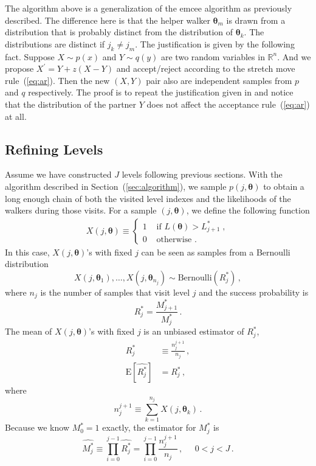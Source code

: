\documentclass[letterpaper, preprint]{aastex}
\newcommand{\bth} {\boldsymbol \theta}
\newcommand{\ee}{\mathrm{E}}
\begin{document}
The algorithm above is a generalization of the emcee algorithm as previously described. The difference here is that the helper walker $\bth_m$ is drawn from a distribution that is probably distinct from the distribution of $\bth_k$. The distributions are distinct if $j_k \neq j_m$. The justification is given by the following fact.
Suppose $X \sim p(x)$ and $Y \sim q(y)$ are two random variables in ${\mathbb R}^n$. And we propose $X^{\prime} = Y + z(X-Y)$ and accept/reject according to the stretch move rule~(\ref{eq:ar}). Then the new $(X,Y)$ pair also are independent samples from $p$ and $q$ respectively. The proof is to repeat the justification given in \citep{goodman10a} and notice that the distribution of the partner $Y$ does not affect the acceptance rule~(\ref{eq:ar}) at all.

\subsection{Refining Levels}
\label{sec:refining}

Assume we have constructed $J$ levels following previous sections. With the algorithm described in Section~(\ref{sec:algorithm}), we sample $p(j,\bth)$ to obtain a long enough chain of both the visited level indexes and the likelihoods of the walkers during those visits. For a sample $(j, \bth)$, we define the following function
\begin{eqnarray}
X(j, \bth) \equiv \left\{ \begin{array}{ll}
               1 & \mbox{ if } L(\bth)>L_{j+1}^*\; ,\\
               0 & \mbox{ otherwise .} \end{array}  \right.
\label{eq:Bern-Ind}
\end{eqnarray}
In this case, $X(j, \bth)$'s with fixed $j$ can be seen as samples from a Bernoulli distribution
\begin{equation}
X(j, \bth_1),\ldots,X(j, \bth_{n_j}) \sim \mbox{Bernoulli}( R^*_j )\, ,
\end{equation}
where $n_j$ is the number of samples that visit level $j$ and the success probability is
\begin{equation}
R^*_j = \frac{M^*_{j+1}} {M^*_j} \, . 
\end{equation}
The mean of $X(j,\bth)$'s with fixed $j$ is an unbiased estimator of  $R^*_j$, 
\begin{align}
\widehat{ R^*_j } &\equiv \frac{n_j^{j+1}}{n_j}\, ,\\
\ee \left[ \widehat{ R^*_j }  \right] &= R^*_j\, ,
\end{align}
where
\begin{equation}
n_j^{j+1}  \equiv \sum_{k=1}^{n_j}X(j, \bth_k)\, .
\end{equation}
Because we know $M^*_0=1$ exactly, the estimator for $M^*_j$ is
\begin{equation}
\widehat{ M^*_j } \equiv \prod_{i=0}^{j-1} \widehat{R^*_j} = \prod_{i=0}^{j-1} \frac{n_j^{j+1}}{n_j}\, , \;\;\;\;\; 0 < j < J\, .
\end{equation}
\end{document}
